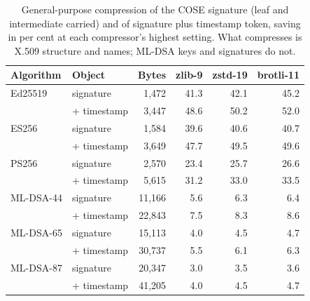 \begin{table}[ht]
\caption{General-purpose compression of the COSE signature (leaf and intermediate carried) and of signature plus timestamp token, saving in per cent at each compressor's highest setting. What compresses is X.509 structure and names; ML-DSA keys and signatures do not.}
\label{tab:compress}
\small
\begin{tabular}{llrrrr}
\toprule
Algorithm & Object & Bytes & zlib-9 & zstd-19 & brotli-11\\
\midrule
Ed25519 & signature & 1,472 & 41.3 & 42.1 & 45.2\\
 & + timestamp & 3,447 & 48.6 & 50.2 & 52.0\\
ES256 & signature & 1,584 & 39.6 & 40.6 & 40.7\\
 & + timestamp & 3,649 & 47.7 & 49.5 & 49.6\\
PS256 & signature & 2,570 & 23.4 & 25.7 & 26.6\\
 & + timestamp & 5,615 & 31.2 & 33.0 & 33.5\\
ML-DSA-44 & signature & 11,166 & 5.6 & 6.3 & 6.4\\
 & + timestamp & 22,843 & 7.5 & 8.3 & 8.6\\
ML-DSA-65 & signature & 15,113 & 4.0 & 4.5 & 4.7\\
 & + timestamp & 30,737 & 5.5 & 6.1 & 6.3\\
ML-DSA-87 & signature & 20,347 & 3.0 & 3.5 & 3.6\\
 & + timestamp & 41,205 & 4.0 & 4.5 & 4.7\\
\bottomrule
\end{tabular}
\end{table}

